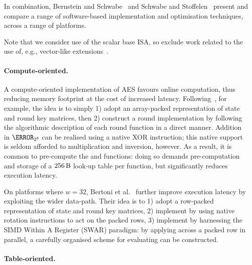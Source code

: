 

In combination,
Bernstein and   Schwabe~\cite{BerSch:08}
and
Schwabe   and Stoffelen~\cite{SchSto:16}
present and compare a range of software-based implementation and 
optimisation techniques, across a range of platforms.

Note that we consider use of the scalar base ISA, so exclude work related
to the use of, e.g., vector-like extensions~\cite{Hamburg:09}.


\paragraph{Compute-oriented.}

A compute-oriented implementation of AES favours
 online     computation, 
thus reducing 
memory footprint
at the cost of increased 
latency.
Following~\cite[Section 4.1]{DaeRij:02}, for example, the idea is to simply
1) adopt an
    array-packed
   representation of state and round key matrices,
   then
2) construct a round implementation by following the algorithmic description
   of each round function in a direct manner.
Addition in $\F_{2^8}$ can be realised using a native XOR instruction; this
native support is seldom afforded to multiplication and inversion, however.
As a result, it is common to pre-compute the  and  
functions:
doing so demands pre-computation and storage of a
$
\SI{256}{\byte}
$
look-up table per function, but significantly reduces execution latency.

On platforms where $w = 32$,
Bertoni et al.~\cite{BBFMM:02}
further improve execution latency by exploiting the wider data-path.  Their
idea is to
1) adopt a 
      row-packed
   representation of state and round key matrices,
2) implement
   by using native rotation instructions to act on the packed
   rows,
3) implement
   by harnessing the SIMD Within A Register (SWAR) paradigm:
   by applying
   across a packed row in parallel,
   a carefully organised scheme for evaluating
   can be constructed.


\paragraph  {Table-oriented.}

